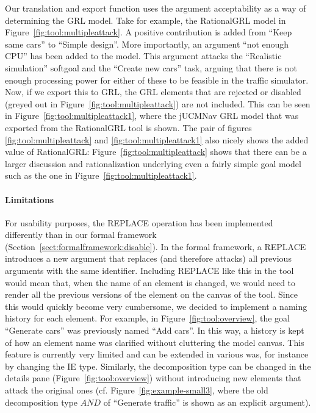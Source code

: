 Our translation and export function uses the argument acceptability as a way of determining the GRL model. Take for example, the RationalGRL model in Figure~\ref{fig:tool:multipleattack}. A positive contribution is added from ``Keep same cars'' to ``Simple design''. More importantly, an argument ``not enough CPU'' has been added to the model. This argument attacks the ``Realistic simulation'' softgoal and the ``Create new cars'' task, arguing that there is not enough processing power for either of these to be feasible in the traffic simulator. Now, if we export this to GRL, the GRL elements that are rejected or disabled (greyed out in Figure~\ref{fig:tool:multipleattack}) are not included. This can be seen in Figure~\ref{fig:tool:multipleattack1}, where the jUCMNav GRL model that was exported from the RationalGRL tool is shown. The pair of figures \ref{fig:tool:multipleattack} and \ref{fig:tool:multipleattack1} also nicely shows the added value of RationalGRL: Figure~\ref{fig:tool:multipleattack} shows that there can be a larger discussion and rationalization underlying even a fairly simple goal model such as the one in Figure~\ref{fig:tool:multipleattack1}. 

\paragraph{Limitations}
For usability purposes, the \textsf{REPLACE} operation has been implemented differently than in our formal framework (Section~\ref{sect:formalframework:disable}). In the formal framework, a \textsf{REPLACE} introduces a new argument that replaces (and therefore attacks) all previous arguments with the same identifier. Including \textsf{REPLACE} like this in the tool would mean that, when the name of an element is changed, we would need to render all the previous versions of the element on the canvas of the tool. Since this would quickly become very cumbersome, we decided to implement a naming history for each element. For example, in Figure~\ref{fig:tool:overview}, the goal ``Generate cars'' was previously named ``Add cars''. In this way, a history is kept of how an element name was clarified without cluttering the model canvas. This feature is currently very limited and can be extended in various was, for instance by changing the IE type. Similarly, the decomposition type can be changed in the details pane (Figure~\ref{fig:tool:overview}) without introducing new elements that attack the original ones (cf. Figure~\ref{fig:example-small3}, where the old decomposition type $AND$ of ``Generate traffic'' is shown as an explicit argument).
